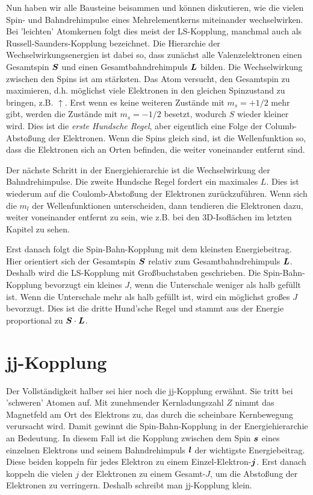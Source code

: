 Nun haben wir alle Bausteine beisammen und können diskutieren, wie die vielen Spin- und Bahndrehimpulse eines Mehrelementkerns miteinander wechselwirken. Bei 'leichten' Atomkernen folgt dies meist der LS-Kopplung, manchmal auch als Russell-Saunders-Kopplung bezeichnet. Die Hierarchie der Wechselwirkungsenergien ist dabei so, dass zunächst alle Valenzelektronen einen Gesamtspin $\boldsymbol{S}$ und einen Gesamtbahndrehimpuls $\boldsymbol{L}$ bilden. Die Wechselwirkung zwischen den Spins ist am stärksten. Das Atom versucht, den Gesamtspin zu maximieren, d.h. möglichst viele Elektronen in den gleichen Spinzustand zu bringen, z.B. $\uparrow$. Erst wenn es keine weiteren Zustände mit $m_s = +1/2$ mehr gibt, werden die Zustände mit $m_s = -1/2$ besetzt, wodurch $S$ wieder kleiner wird. Dies ist die \emph{erste Hundsche Regel}, aber eigentlich eine Folge der Columb-Abstoßung der Elektronen. Wenn die Spins gleich sind, ist die Wellenfunktion so, dass die Elektronen sich an Orten befinden, die weiter voneinander entfernt sind.

Der nächste Schritt in der Energiehierarchie ist die Wechselwirkung der Bahndrehimpulse. Die zweite Hundsche Regel fordert ein maximales $L$. Dies ist wiederum auf die Coulomb-Abstoßung der Elektronen zurückzuführen. Wenn sich die $m_l$ der Wellenfunktionen unterscheiden, dann tendieren die Elektronen dazu, weiter voneinander entfernt zu sein, wie z.B. bei den 3D-Isoflächen im letzten Kapitel zu sehen.

Erst danach folgt die Spin-Bahn-Kopplung mit dem kleinsten Energiebeitrag. Hier orientiert sich der Gesamtspin $\boldsymbol{S}$ relativ zum Gesamtbahndrehimpuls $\boldsymbol{L}$. Deshalb wird die LS-Kopplung mit Großbuchstaben geschrieben. Die Spin-Bahn-Kopplung bevorzugt ein kleines $J$, wenn die Unterschale weniger als halb gefüllt ist. Wenn die Unterschale mehr als halb gefüllt ist, wird ein möglichst großes $J$ bevorzugt. Dies ist die dritte Hund'sche Regel und stammt aus der Energie  proportional zu $\boldsymbol{S} \cdot \boldsymbol{L}$.

\section{jj-Kopplung}

Der Vollständigkeit halber sei hier noch die jj-Kopplung erwähnt. Sie tritt bei 'schweren' Atomen auf. Mit zunehmender Kernladungszahl $Z$ nimmt das Magnetfeld am Ort des Elektrons zu, das durch die scheinbare Kernbewegung verursacht wird. Damit gewinnt die Spin-Bahn-Kopplung in der Energiehierarchie an Bedeutung. In diesem Fall ist die Kopplung zwischen dem Spin $\boldsymbol{s}$ eines einzelnen Elektrons und seinem Bahndrehimpuls $\boldsymbol{l}$ der wichtigste Energiebeitrag. Diese beiden koppeln für jedes Elektron zu einem Einzel-Elektron-$\boldsymbol{j}$. Erst danach koppeln die vielen $j$ der Elektronen zu einem Gesamt-$J$, um die Abstoßung der Elektronen zu verringern. Deshalb schreibt man jj-Kopplung klein.


